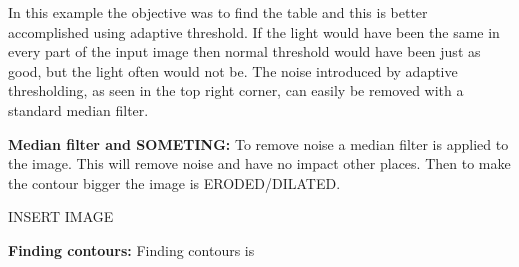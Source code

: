 In this example the objective was to find the table and this is better accomplished using adaptive threshold. If the light would have been the same in every part of the input image then normal threshold would have been just as good, but the light often would not be. The noise introduced by adaptive thresholding, as seen in the top right corner, can easily be removed with a standard median filter.

\textbf{Median filter and SOMETING:}
To remove noise a median filter is applied to the image. This will remove noise and have no impact other places.
Then to make the contour bigger the image is ERODED/DILATED.

INSERT IMAGE

\textbf{Finding contours:}
Finding contours is 

